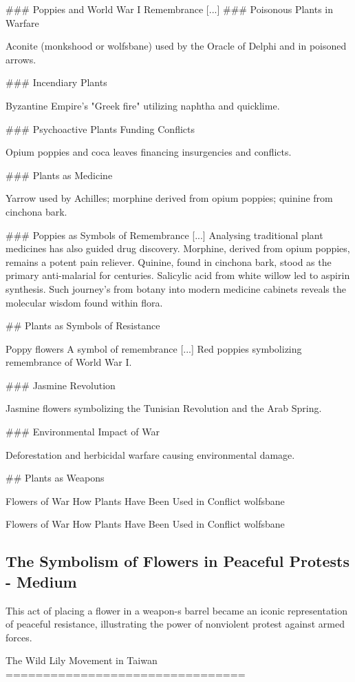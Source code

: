 \documentclass[12pt]{article}
\begin{document}
\#\#\# Poppies and World War I Remembrance [...] \#\#\# Poisonous Plants in Warfare

Aconite (monkshood or wolfsbane) used by the Oracle of Delphi and in poisoned arrows.

\#\#\# Incendiary Plants

Byzantine Empire's "Greek fire" utilizing naphtha and quicklime.

\#\#\# Psychoactive Plants Funding Conflicts

Opium poppies and coca leaves financing insurgencies and conflicts.

\#\#\# Plants as Medicine

Yarrow used by Achilles; morphine derived from opium poppies; quinine from cinchona bark.

\#\#\# Poppies as Symbols of Remembrance [...] Analysing traditional plant medicines has also guided drug discovery. Morphine, derived from opium poppies, remains a potent pain reliever. Quinine, found in cinchona bark, stood as the primary anti-malarial for centuries. Salicylic acid from white willow led to aspirin synthesis. Such journey's from botany into modern medicine cabinets reveals the molecular wisdom found within flora.

\#\# Plants as Symbols of Resistance

Poppy flowers A symbol of remembrance [...] Red poppies symbolizing remembrance of World War I.

\#\#\# Jasmine Revolution

Jasmine flowers symbolizing the Tunisian Revolution and the Arab Spring.

\#\#\# Environmental Impact of War

Deforestation and herbicidal warfare causing environmental damage.

\#\# Plants as Weapons

Flowers of War How Plants Have Been Used in Conflict wolfsbane

Flowers of War How Plants Have Been Used in Conflict wolfsbane\subsection{The Symbolism of Flowers in Peaceful Protests - Medium}
This act of placing a flower in a weapon-s barrel became an iconic representation of peaceful resistance, illustrating the power of nonviolent protest against armed forces.

The Wild Lily Movement in Taiwan
================================
\end{document}
